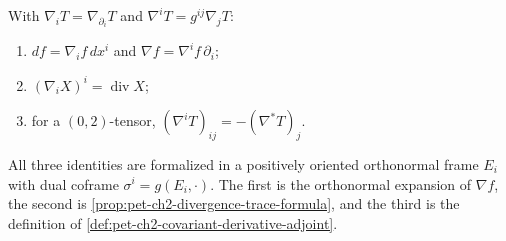\begin{remark}
  \label{rem:pet-ch2-ex-34}
  \leanok
  With
  $\nabla_iT=\nabla_{\partial_i}T$ and
  $\nabla^iT=g^{ij}\nabla_jT$:
  \begin{enumerate}
    \item $df=\nabla_if\,dx^i$ and
      $\nabla f=\nabla^if\,\partial_i$;
    \item $(\nabla_iX)^i=\operatorname{div}X$;
    \item for a $(0,2)$-tensor,
      $(\nabla^iT)_{ij}=-(\nabla^*T)_j$.
  \end{enumerate}
  All three identities are formalized in a positively oriented orthonormal
  frame $E_i$ with dual coframe $\sigma^i=g(E_i,\cdot)$.
  \sketch
  The first is the
  orthonormal expansion of $\nabla f$, the second is
  \cref{prop:pet-ch2-divergence-trace-formula}, and the third is the definition
  of \cref{def:pet-ch2-covariant-derivative-adjoint}.
\end{remark}
